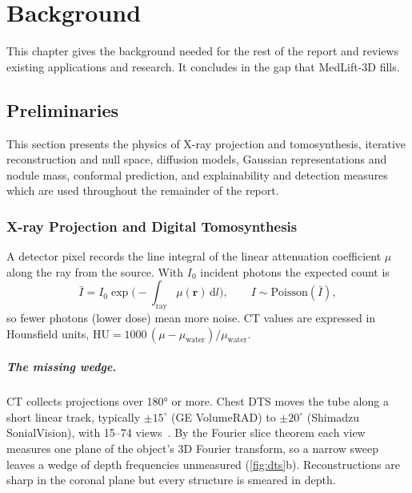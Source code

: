 \chapter{Background}
\label{ch:background}

This chapter gives the background needed for the rest of the report and reviews existing applications and research. It concludes in the gap that MedLift-3D fills.

\section{Preliminaries}

This section presents the physics of X-ray projection and tomosynthesis, iterative reconstruction and null space, diffusion models, Gaussian representations and nodule mass, conformal prediction, and explainability and detection measures which are used throughout the remainder of the report.

\subsection{X-ray Projection and Digital Tomosynthesis}
 A detector pixel records the line integral of the linear attenuation coefficient $\mu$ along the ray from the source. With $I_0$ incident photons the expected count is
\begin{equation}
  \bar I = I_0 \exp\Big(-\int_{\text{ray}} \mu(\mathbf{r})\, \mathrm{d}l\Big), \qquad I \sim \mathrm{Poisson}(\bar I),
\end{equation}
so fewer photons (lower dose) mean more noise. CT values are expressed in Hounsfield units, $\mathrm{HU} = 1000\,(\mu-\mu_{\text{water}})/\mu_{\text{water}}$.

\paragraph{The missing wedge.} CT collects projections over \ang{180} or more. Chest DTS moves the tube along a short linear track, typically $\pm15^\circ$ (GE VolumeRAD) to $\pm20^\circ$ (Shimadzu SonialVision), with 15--74 views~\cite{dobbins2003dts}. By the Fourier slice theorem each view measures one plane of the object's 3D Fourier transform, so a narrow sweep leaves a wedge of depth frequencies unmeasured (\cref{fig:dts}b). Reconstructions are sharp in the coronal plane but every structure is smeared in depth.

